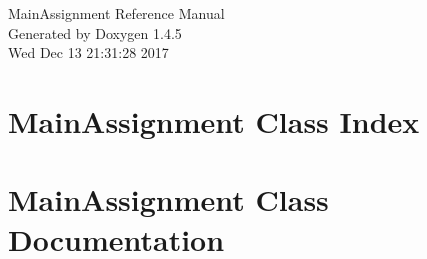 \documentclass[a4paper]{book}
\begin{document}
\begin{titlepage}
\vspace*{7cm}
\begin{center}
{\Large Main\-Assignment Reference Manual}\\
\vspace*{1cm}
{\large Generated by Doxygen 1.4.5}\\
\vspace*{0.5cm}
{\small Wed Dec 13 21:31:28 2017}\\
\end{center}
\end{titlepage}
\clearemptydoublepage
{}
\tableofcontents
\clearemptydoublepage
{}
\chapter{Main\-Assignment Class Index}

\chapter{Main\-Assignment Class Documentation}






\printindex
\end{document}
